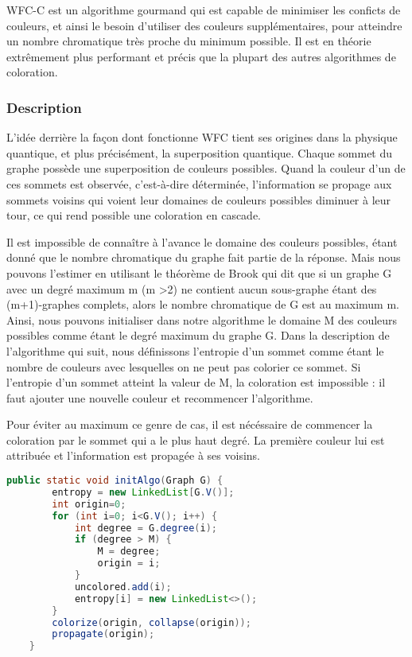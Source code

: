 WFC-C est un algorithme gourmand qui est capable de minimiser les conficts de couleurs, et ainsi le besoin d'utiliser des couleurs supplémentaires, pour atteindre un nombre chromatique très proche du minimum possible. Il est en théorie extrêmement plus performant et précis que la plupart des autres algorithmes de coloration.

\subsubsection{Description}

L'idée derrière la façon dont fonctionne WFC tient ses origines dans la physique quantique, et plus précisément, la superposition quantique. Chaque sommet du graphe possède une superposition de couleurs possibles. Quand la couleur d'un de ces sommets est observée, c'est-à-dire déterminée, l'information se propage aux sommets voisins qui voient leur domaines de couleurs possibles diminuer à leur tour, ce qui rend possible une coloration en cascade.

Il est impossible de connaître à l'avance le domaine des couleurs possibles, étant donné que le nombre chromatique du graphe fait partie de la réponse. Mais nous pouvons l'estimer en utilisant le théorème de Brook qui dit que si un graphe G avec un degré maximum m (m >2) ne contient aucun sous-graphe étant des (m+1)-graphes complets, alors le nombre chromatique de G est au maximum m. \\
Ainsi, nous pouvons initialiser dans notre algorithme le domaine M des couleurs possibles comme étant le degré maximum du graphe G. Dans la description de l'algorithme qui suit, nous définissons l'entropie d'un sommet comme étant le nombre de couleurs avec lesquelles on ne peut pas colorier ce sommet. Si l'entropie d'un sommet atteint la valeur de M, la coloration est impossible : il faut ajouter une nouvelle couleur et recommencer l'algorithme.

Pour éviter au maximum ce genre de cas, il est nécéssaire de commencer la coloration par le sommet qui a le plus haut degré. La première couleur lui est attribuée et l'information est propagée à ses voisins.
\\
\begin{lstlisting}[language=java]
    public static void initAlgo(Graph G) {
        entropy = new LinkedList[G.V()];
        int origin=0;
        for (int i=0; i<G.V(); i++) {
            int degree = G.degree(i);
            if (degree > M) {
                M = degree;
                origin = i;
            }
            uncolored.add(i);
            entropy[i] = new LinkedList<>();
        }
        colorize(origin, collapse(origin));
        propagate(origin);
    }
\end{lstlisting}

